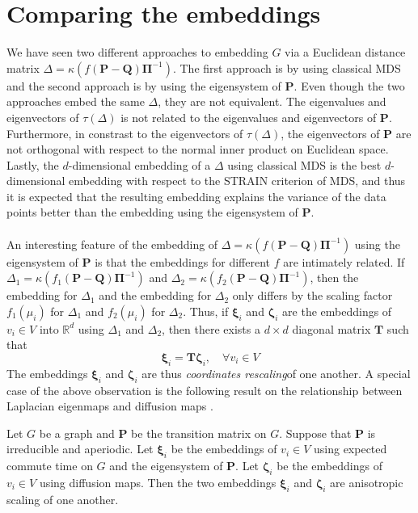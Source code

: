 \section{Comparing the embeddings}
\label{sec:comparing-embeddings}
\noindent
We have seen two different approaches to embedding $G$ via a Euclidean
distance matrix $\Delta = \kappa(f(\mathbf{P} -
\mathbf{Q})\bm{\Pi}^{-1})$. The first approach is by using classical
MDS and the second approach is by using the eigensystem of
$\mathbf{P}$.  Even though the two approaches embed the same $\Delta$,
they are not equivalent. The eigenvalues and eigenvectors of
$\tau(\Delta)$ is not related to the eigenvalues and eigenvectors of
$\mathbf{P}$. Furthermore, in constrast to the eigenvectors of
$\tau(\Delta)$, the eigenvectors of $\mathbf{P}$ are not orthogonal
with respect to the normal inner product on Euclidean space. Lastly,
the $d$-dimensional embedding of a $\Delta$ using classical MDS is the
best $d$-dimensional embedding with respect to the STRAIN criterion of
MDS, and thus it is expected that the resulting embedding explains the
variance of the data points better than the embedding using the
eigensystem of $\mathbf{P}$. \\ \\
\noindent
An interesting feature of the embedding of $\Delta =
\kappa(f(\mathbf{P} - \mathbf{Q})\bm{\Pi}^{-1}) $ using the
eigensystem of $\mathbf{P}$ is that the embeddings for different $f$
are intimately related. If $\Delta_1 = \kappa(f_1(\mathbf{P} -
\mathbf{Q})\bm{\Pi}^{-1})$ and $\Delta_2 = \kappa(f_2(\mathbf{P} -
\mathbf{Q})\bm{\Pi}^{-1})$, then the embedding for $\Delta_1$ and the
embedding for $\Delta_2$ only differs by the scaling factor
$f_1(\mu_i)$ for $\Delta_1$ and $f_2(\mu_i)$ for $\Delta_2$. Thus, if
$\bm{\xi}_i$ and $\bm{\zeta}_i$ are the embeddings of $v_i \in V$ into
$\mathbb{R}^{d}$ using $\Delta_1$ and $\Delta_2$, then there exists a
$d \times d$ diagonal matrix $\mathbf{T}$ such that
\begin{equation}
  \label{eq:123}
  \bm{\xi}_i = \mathbf{T} \bm{\zeta}_i, \quad \forall v_i \in V
\end{equation}
The embeddings $\bm{\xi}_i$ and $\bm{\zeta}_i$ are thus {\em
  coordinates rescaling}\/of one another. A special case of the above
observation is the following result on the relationship between
Laplacian eigenmaps \cite{belkin03:_laplac} and diffusion maps
\cite{coifman06:_diffus_maps}.
\begin{proposition}
  \label{prop:27}
  Let $G$ be a graph and $\mathbf{P}$ be the transition matrix on
  $G$. Suppose that $\mathbf{P}$ is irreducible and aperiodic. Let
  $\bm{\xi}_i$ be the embeddings of $v_i \in V$ using expected commute
  time on $G$ and the eigensystem of $\mathbf{P}$. Let $\bm{\zeta}_i$
  be the embeddings of $v_i \in V$ using diffusion maps. Then the two
  embeddings $\bm{\xi}_i$ and $\bm{\zeta}_i$ are anisotropic scaling
  of one another.
\end{proposition}
